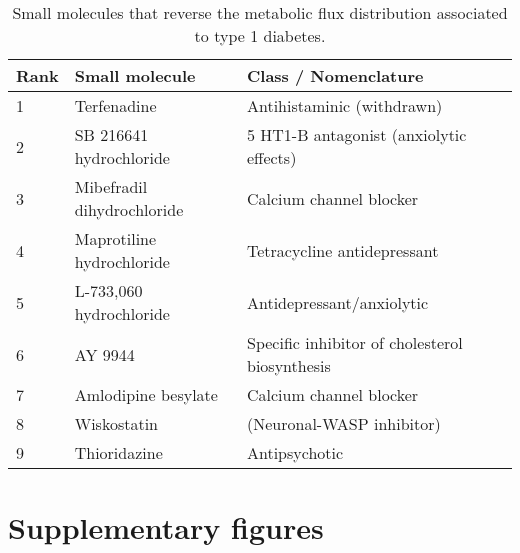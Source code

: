 \begin{table}[h]
\caption[Small molecules that reverse type 1 diabetes metabolic fluxes.]{Small molecules that reverse the metabolic flux distribution associated to type 1 diabetes.}
\begin{center}
	\begin{tabular*}{\textwidth}{l @{\extracolsep{\fill}} ll}
	\hline
	Rank & Small molecule  & Class / Nomenclature         \\ 
	\hline
	1    & Terfenadine & Antihistaminic (withdrawn)   \\
	2    & SB 216641 hydrochloride & 5 HT1-B antagonist (anxiolytic effects) \\
	3    & Mibefradil dihydrochloride & Calcium channel blocker   \\
	4    & Maprotiline hydrochloride & Tetracycline antidepressant \\
	5    & L-733,060 hydrochloride & Antidepressant/anxiolytic         \\
	6    & AY 9944  & Specific inhibitor of cholesterol biosynthesis        \\
	7    & Amlodipine besylate & Calcium channel blocker \\
    8    & Wiskostatin        & (Neuronal-WASP inhibitor)     \\
    9    & Thioridazine & Antipsychotic \\
	\hline
	\end{tabular*}
\end{center}
\label{GIM:tbls6}%
\end{table}


\clearpage
\section{Supplementary figures}
